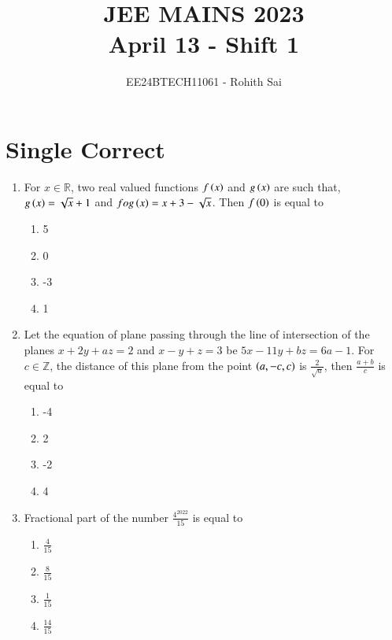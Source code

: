 \documentclass[journal]{IEEEtran}
\begin{document}

\vspace{3cm}

\title{JEE MAINS 2023\\ April 13 - Shift 1}
\author{EE24BTECH11061 - Rohith Sai}
\maketitle

\renewcommand{\thefigure}{\theenumi}
\renewcommand{\thetable}{\theenumi}

\section*{Single Correct }

\begin{enumerate}
\item For $x \in \mathbb{R}$, two real valued functions $f\left(x\right)$ and $g\left(x\right)$ are such that, $g\left(x\right) = \sqrt{x}+1$  and $fog\left(x\right) = x+3-\sqrt{x}$. Then $f\left(0\right)$ is equal to
\begin{multicols}{2}
    \begin{enumerate}
        \item 5
        \item 0
        \item -3
        \item 1
    \end{enumerate}
\end{multicols}

\item Let the equation of plane passing through the line of intersection of the planes $x+2y+az=2$ and $x-y+z=3$ be $5x-11y+bz = 6a-1$. For $c \in \mathbb{Z}$, the distance of this plane from the point $\left(a, -c, c\right)$ is $\frac{2}{\sqrt{a}}$, then $\frac{a+b}{c}$ is equal to
\begin{multicols}{2}
    \begin{enumerate}
        \item -4
        \item 2
        \item -2
        \item 4
    \end{enumerate}
\end{multicols}

\item Fractional part of the number $\frac{4^{2022}}{15}$ is  equal to
\begin{multicols}{2}
    \begin{enumerate}
        \item $\frac{4}{15}$
        \item $\frac{8}{15}$
        \item $\frac{1}{15}$
        \item $\frac{14}{15}$
    \end{enumerate}
\end{multicols}


\end{enumerate}
\end{document}
